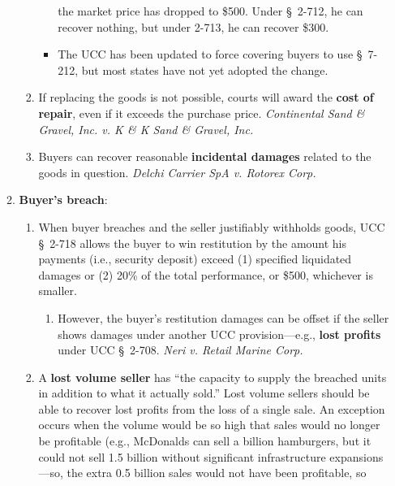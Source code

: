 \begin{enumerate}
\begin{enumerate}
\begin{enumerate}
\begin{itemize}
                the market price has dropped to \$500. Under \S\ 2-712, he can 
                recover nothing, but under 2-713, he can recover \$300.
                \item The UCC has been updated to force covering buyers to use 
                \S\ 7-212, but most states have not yet adopted the change.
            \end{itemize}
            \item If replacing the goods is not possible, courts will award 
            the \textbf{cost of repair}, even if it exceeds the purchase 
            price.  \emph{Continental Sand \& Gravel, Inc. v. K \& K Sand \& 
            Gravel, Inc.}
            \item Buyers can recover reasonable \textbf{incidental damages} 
            related to the goods in question. \emph{Delchi Carrier SpA v. 
            Rotorex Corp.}
        \end{enumerate}
        \item \textbf{Buyer's breach}:
        \begin{enumerate}
            \item When buyer breaches and the seller justifiably withholds 
            goods, UCC \S\ 2-718 allows the buyer to win restitution by the 
            amount his payments (i.e., security deposit) exceed (1) specified 
            liquidated damages or (2) 20\% of the total performance, or \$500, 
            whichever is smaller.
            \begin{enumerate}
                \item However, the buyer's restitution damages can be offset 
                if the seller shows damages under another UCC 
                provision---e.g., \textbf{lost profits} under UCC \S\ 2-708. 
                \emph{Neri v. Retail Marine Corp.}
            \end{enumerate}
            \item A \textbf{lost volume seller} has ``the capacity to supply 
            the breached units in addition to what it actually sold.'' Lost 
            volume sellers should be able to recover lost profits from the 
            loss of a single sale. An exception occurs when the volume would 
            be so high that sales would no longer be profitable (e.g., 
            McDonalds can sell a billion hamburgers, but it could not sell 1.5 
            billion without significant infrastructure expansions---so, the 
            extra 0.5 billion sales would not have been profitable, so 

\end{enumerate}
\end{enumerate}
\end{enumerate}
